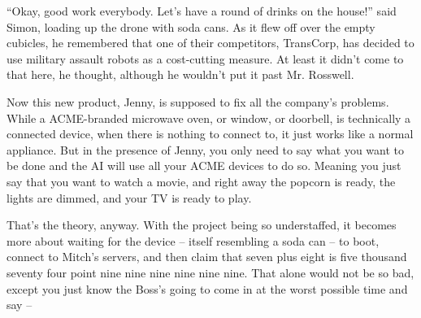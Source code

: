 \documentclass[10pt,a4paper]{article}
\newcommand{\lang}[2]{ #2 \par}
\newcommand{\ainame}{Jenny}
\newcommand{\mainname}{Simon}
\newcommand{\auxname}{Mitch}
\newcommand{\corpnameshort}{ACME}
\newcommand{\ceoname}{Mr. Rosswell}
\begin{document}
\lang{-- Так, вы все сегодня хорошо поработали. Вот, угощайтесь -- за счёт компании! -- сказал \mainname{}, загружая в дрон бутылки с газировкой. Провожая его взглядом, он вспомнил, что в компании TransCorp, конкуренте \corpnameshort{}, теперь используют военных десантных роботов как меру снижения затрат. Хотя бы тут до этого не дошло, хотя \ceoname{} и не на такое способен.}{``Okay, good work everybody. Let's have a round of drinks on the house!'' said \mainname{}, loading up the drone with soda cans. As it flew off over the empty cubicles, he remembered that one of their competitors, TransCorp, has decided to use military assault robots as a cost-cutting measure. At least it didn't come to that here, he thought, although he wouldn't put it past \ceoname{}.}
\lang{Вот этот новый продукт, \ainame{}, должен решить все трудности компании. Под брендом \corpnameshort{} продаются и микроволновки, и окна, и дверные звонки, и строго говоря это умные устройства, но они не ведут себя умно, если нету центра, к которому они подключались бы. А если у вас есть \ainame{}, то вам надо только сказать, что вам нужно, и все устройства \corpnameshort{} будут для этого задействованы. Вам лишь надо сказать о том, что хотите посмотреть фильм, и сразу попкорн готов, свет притушен, а телевизор включен и фильм скачан.}{Now this new product, \ainame{}, is supposed to fix all the company's problems. While a \corpnameshort{}-branded microwave oven, or window, or doorbell, is technically a connected device, when there is nothing to connect to, it just works like a normal appliance. But in the presence of \ainame{}, you only need to say what you want to be done and the AI will use all your \corpnameshort{} devices to do so. Meaning you just say that you want to watch a movie, and right away the popcorn is ready, the lights are dimmed, and your TV is ready to play.}
\lang{Так оно работает только в теории. Над проектом работает критически мало людей, поэтому больше времени все ждут, пока устройство -- а оно само выглядит, как банка газировки -- загрузится, подключится к серверам \auxname{}, а затем заявит, что семь плюс восемь -- пять тысяч семьдесят четыре точка девять девять девять девять девять. И даже это не было бы слишком плохо, но ведь понятно же, что директор зайдёт в самый неподходящий момент и скажет --}{That's the theory, anyway. With the project being so understaffed, it becomes more about waiting for the device -- itself resembling a soda can -- to boot, connect to \auxname{}'s servers, and then claim that seven plus eight is five thousand seventy four point nine nine nine nine nine nine. That alone would not be so bad, except you just know the Boss's going to come in at the worst possible time and say --}
\end{document}

